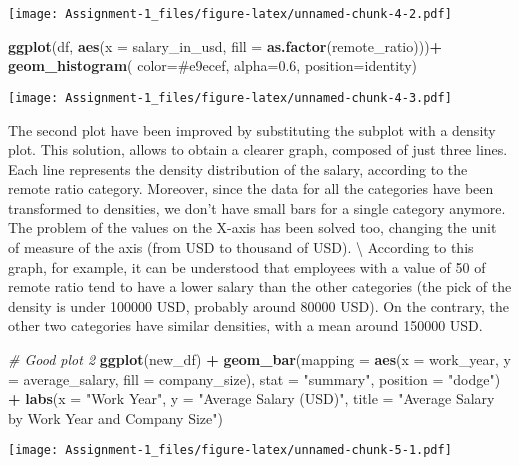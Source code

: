 \documentclass[
]{article}
\newenvironment{Shaded}{\begin{snugshade}}{\end{snugshade}}
\newcommand{\AttributeTok}[1]{\textcolor[rgb]{0.13,0.29,0.53}{#1}}
\newcommand{\CommentTok}[1]{\textcolor[rgb]{0.56,0.35,0.01}{\textit{#1}}}
\newcommand{\FloatTok}[1]{\textcolor[rgb]{0.00,0.00,0.81}{#1}}
\newcommand{\FunctionTok}[1]{\textcolor[rgb]{0.13,0.29,0.53}{\textbf{#1}}}
\newcommand{\NormalTok}[1]{#1}
\newcommand{\SpecialCharTok}[1]{\textcolor[rgb]{0.81,0.36,0.00}{\textbf{#1}}}
\newcommand{\StringTok}[1]{\textcolor[rgb]{0.31,0.60,0.02}{#1}}
\begin{document}
\texttt{[image: Assignment-1\_files/figure-latex/unnamed-chunk-4-2.pdf]}

\begin{Shaded}
\begin{Highlighting}[]
\FunctionTok{ggplot}\NormalTok{(df, }\FunctionTok{aes}\NormalTok{(}\AttributeTok{x =}\NormalTok{ salary\_in\_usd, }\AttributeTok{fill =} \FunctionTok{as.factor}\NormalTok{(remote\_ratio)))}\SpecialCharTok{+}
  \FunctionTok{geom\_histogram}\NormalTok{( }\AttributeTok{color=}\StringTok{\textquotesingle{}\#e9ecef\textquotesingle{}}\NormalTok{, }\AttributeTok{alpha=}\FloatTok{0.6}\NormalTok{, }\AttributeTok{position=}\StringTok{\textquotesingle{}identity\textquotesingle{}}\NormalTok{)}
\end{Highlighting}
\end{Shaded}

\texttt{[image: Assignment-1\_files/figure-latex/unnamed-chunk-4-3.pdf]}

The second plot have been improved by substituting the subplot with a
density plot. This solution, allows to obtain a clearer graph, composed
of just three lines. Each line represents the density distribution of
the salary, according to the remote ratio category. Moreover, since the
data for all the categories have been transformed to densities, we don't
have small bars for a single category anymore. The problem of the values
on the X-axis has been solved too, changing the unit of measure of the
axis (from USD to thousand of USD). \textbackslash{} According to this
graph, for example, it can be understood that employees with a value of
50 of remote ratio tend to have a lower salary than the other categories
(the pick of the density is under 100000 USD, probably around 80000
USD). On the contrary, the other two categories have similar densities,
with a mean around 150000 USD. \newline

\begin{Shaded}
\begin{Highlighting}[]
\CommentTok{\# Good plot 2}
\FunctionTok{ggplot}\NormalTok{(new\_df) }\SpecialCharTok{+}
  \FunctionTok{geom\_bar}\NormalTok{(}\AttributeTok{mapping =} \FunctionTok{aes}\NormalTok{(}\AttributeTok{x =}\NormalTok{ work\_year, }\AttributeTok{y =}\NormalTok{ average\_salary, }\AttributeTok{fill =}\NormalTok{ company\_size), }
           \AttributeTok{stat =} \StringTok{"summary"}\NormalTok{, }\AttributeTok{position =} \StringTok{"dodge"}\NormalTok{) }\SpecialCharTok{+} 
  \FunctionTok{labs}\NormalTok{(}\AttributeTok{x =} \StringTok{"Work Year"}\NormalTok{, }\AttributeTok{y =} \StringTok{"Average Salary (USD)"}\NormalTok{, }\AttributeTok{title =} \StringTok{"Average Salary by Work Year and Company Size"}\NormalTok{)}
\end{Highlighting}
\end{Shaded}

\texttt{[image: Assignment-1\_files/figure-latex/unnamed-chunk-5-1.pdf]}
\end{document}
